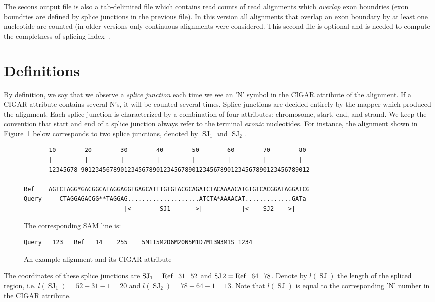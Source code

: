 \documentclass{article}
\DeclareMathOperator{\SJ}{SJ}
\begin{document}
The secons output file is also a tab-delimited file which contains read counts of read alignments which {\em overlap} 
exon boundries (exon boundries are defined by splice junctions in the previous file). In this version all alignments 
that overlap an exon boundary by at least one nucleotide are counted (in older versions only continuous alignments were
considered. This second file is optional and is needed to compute the completness of splicing index~\cite{pmid23172860, pmid22955974}.

\section{Definitions}
By definition, we say that we observe a {\em splice junction} each time we see an 'N' symbol in the CIGAR attribute 
of the alignment. If a CIGAR attribute contains several N's, it will be counted several times. Splice junctions are 
decided entirely by the mapper which produced the alignment. Each 
splice junction is characterized by a combination of four attributes: chromosome, start, end, and strand. We keep 
the convention that start and end of a splice junction always refer to the terminal {\it exonic} nucleotides. For 
instance, the alignment shown in Figure~\ref{fig::01} below corresponds to two splice junctions,  
denoted by $\SJ_1$ and $\SJ_2$. 
%
\begin{figure}[h]
\footnotesize
\begin{verbatim}
       10        20        30        40        50        60        70        80
       |         |         |         |         |         |         |         |
       12345678 9012345678901234567890123456789012345678901234567890123456789012

Ref    AGTCTAGG*GACGGCATAGGAGGTGAGCATTTGTGTACGCAGATCTACAAAACATGTGTCACGGATAGGATCG
Query     CTAGGAGACGG**TAGGAG....................ATCTA*AAAACAT.............GATa
                            |<-----   SJ1  ----->|           |<--- SJ2 --->|
\end{verbatim}
The corresponding SAM line is:
\begin{verbatim}
Query   123   Ref   14    255    5M1I5M2D6M20N5M1D7M13N3M1S 1234 
\end{verbatim}
\caption{An example alignment and its CIGAR attribute\label{fig::01}}
\end{figure}
%
The coordinates of these splice junctions are $\SJ_1=\rm Ref\_31\_52$ and $\SJ2=\rm Ref\_64\_78$. Denote
by $l(\SJ)$ the length of the spliced region, i.e. $l(\SJ_1)=52-31-1=20$ and $l(\SJ_2)=78-64-1=13$. Note that
$l(\SJ)$ is equal to the corresponding 'N' number in the CIGAR attribute.
\end{document}
